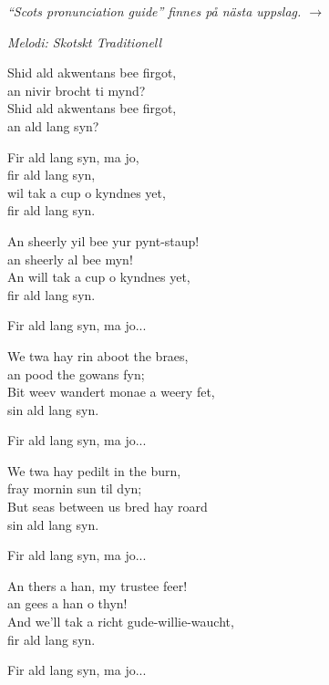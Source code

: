 \vspace{15pt}
{\footnotesize\textit{``Scots pronunciation guide'' finnes på nästa uppslag. $\rightarrow$}}\par
\newpage
{}
{\footnotesize\textit{Melodi: Skotskt Traditionell}}\par
\vspace{10pt}
Shid ald akwentans bee firgot,\\
an nivir brocht ti mynd?\\
Shid ald akwentans bee firgot,\\
an ald lang syn?\par
\vspace{9pt}
Fir ald lang syn, ma jo,\\
fir ald lang syn,\\
wil tak a cup o kyndnes yet,\\
fir ald lang syn.\par
\vspace{9pt}
An sheerly yil bee yur pynt-staup!\\
an sheerly al bee myn!\\
An will tak a cup o kyndnes yet,\\
fir ald lang syn.\par
\vspace{9pt}
Fir ald lang syn, ma jo...\par
\vspace{9pt}
We twa hay rin aboot the braes,\\
an pood the gowans fyn;\\
Bit weev wandert monae a weery fet,\\
sin ald lang syn.\par
\vspace{9pt}
Fir ald lang syn, ma jo...\par
\vspace{9pt}
We twa hay pedilt in the burn,\\
fray mornin sun til dyn;\\
But seas between us bred hay roard\\
sin ald lang syn.\par
\newpage
Fir ald lang syn, ma jo...\par
\vspace{10pt}
An thers a han, my trustee feer!\\
an gees a han o thyn!\\
And we'll tak a richt gude-willie-waucht,\\
fir ald lang syn.\par
\vspace{10pt}
Fir ald lang syn, ma jo...

